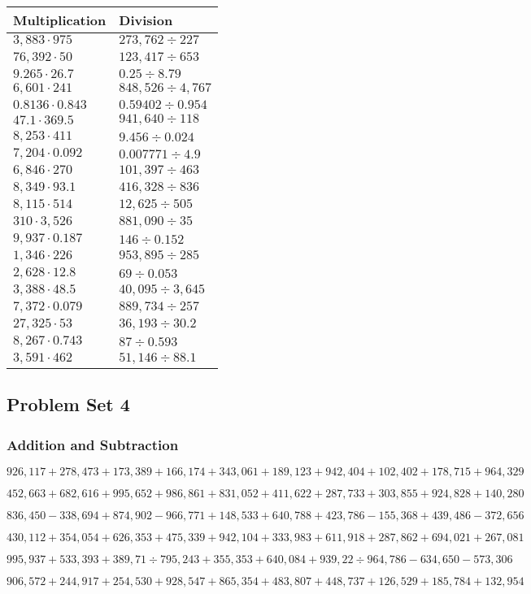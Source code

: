 \begin{longtable}[]{@{}ll@{}}
\toprule
Multiplication & Division\tabularnewline
\midrule
\endhead
\(3,883\cdot975\) & \(273,762÷227\)\tabularnewline
\(76,392\cdot50\) & \(123,417÷653\)\tabularnewline
\(9.265\cdot26.7\) & \(0.25 ÷8.79\)\tabularnewline
\(6,601\cdot241\) & \(848,526÷4,767\)\tabularnewline
\(0.8136\cdot0.843\) & \(0.59402÷0.954\)\tabularnewline
\(47.1\cdot369.5\) & \(941,640÷118\)\tabularnewline
\(8,253\cdot411\) & \(9.456÷0.024\)\tabularnewline
\(7,204\cdot0.092\) & \(0.007771÷4.9\)\tabularnewline
\(6,846\cdot270\) & \(101,397÷463\)\tabularnewline
\(8,349\cdot93.1\) & \(416,328÷836\)\tabularnewline
\(8,115\cdot514\) & \(12,625÷505\)\tabularnewline
\(310\cdot3,526\) & \(881,090÷35\)\tabularnewline
\(9,937\cdot0.187\) & \(146÷0.152\)\tabularnewline
\(1,346\cdot226\) & \(953,895÷285\)\tabularnewline
\(2,628\cdot12.8\) & \(69÷0.053\)\tabularnewline
\(3,388\cdot48.5\) & \(40,095÷3,645\)\tabularnewline
\(7,372\cdot0.079\) & \(889,734÷257\)\tabularnewline
\(27,325\cdot53\) & \(36,193÷30.2\)\tabularnewline
\(8,267\cdot0.743\) & \(87÷0.593\)\tabularnewline
\(3,591\cdot462\) & \(51,146÷88.1\)\tabularnewline
\bottomrule
\end{longtable}

\hypertarget{problem-set-4-5}{%
\subsection{Problem Set 4}\label{problem-set-4-5}}

\hypertarget{addition-and-subtraction-309}{%
\subsubsection{Addition and
Subtraction}\label{addition-and-subtraction-309}}

\(926,117+278,473+173,389+166,174+343,061+189,123+942,404+102,402+178,715+ 964,329\)

\(452,663+682,616+995,652+986,861+831,052+411,622+287,733+303,855+924,828+140,280\)

\(836,450-338,694+874,902-966,771+148,533+640,788+423,786-155,368+439,486-372,656\)

\(430,112+354,054+626,353+475,339+942,104+333,983+611,918+287,862+694,021+267,081\)

\(995,937+533,393+389,71÷795,243+355,353+640,084+939,22÷964,786-634,650-573,306\)

\(906,572+244,917+254,530+928,547+865,354+483,807+448,737+126,529+185,784+132,954\)

